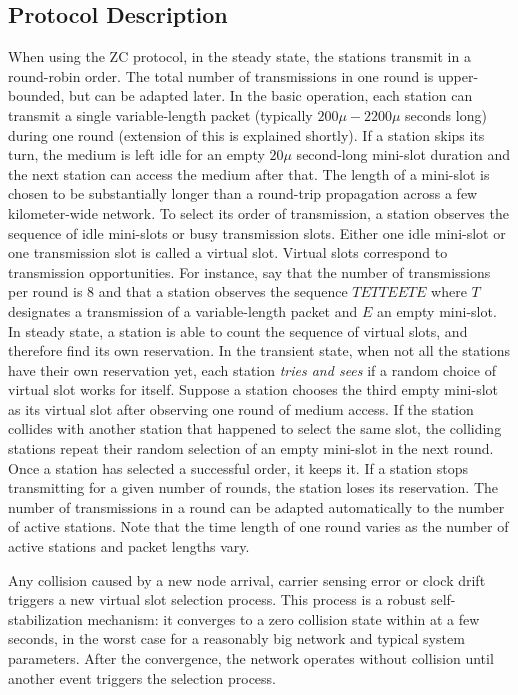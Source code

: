 \documentclass{acm_proc_article-sp}
\begin{document}
\subsection{Protocol Description}
When using the ZC protocol, in the steady state, the stations transmit in a round-robin order.  The total number of transmissions in one round is upper-bounded, but can be adapted later. In the basic operation, each station can transmit a single variable-length packet (typically $200\mu - 2200\mu$ seconds long) during one round (extension of this is explained shortly). If a station skips its turn, the medium is left idle for an empty $20\mu$ second-long mini-slot duration and the next station can access the medium after that. The length of a mini-slot is chosen to be substantially longer than a round-trip propagation across a few kilometer-wide network. To select its order of transmission, a station observes the sequence of idle mini-slots or busy transmission slots. Either one idle mini-slot or one transmission slot is called a virtual slot. Virtual slots correspond to transmission opportunities.  For instance, say that the number of transmissions per round is 8 and that a station observes the sequence $TETTEETE$ where $T$ designates a transmission of a variable-length packet and $E$ an empty mini-slot. In steady state, a station is able to count the sequence of virtual slots, and therefore find its own reservation.
In the transient state, when not all the stations have their own reservation yet, each station \textit{tries and sees} if a random choice of virtual slot works for itself. Suppose a station chooses the third empty mini-slot as its virtual slot after observing one round of medium access. If the station collides with another station that happened to select the same slot, the colliding stations repeat their random selection of an empty mini-slot in the next round.  Once a station has selected a successful order, it keeps it.  If a station stops transmitting for a given number of rounds, the station loses its reservation. The number of transmissions in a round can be adapted automatically to the number of active stations. Note that the time length of one round varies as the number of active stations and packet lengths vary.

Any collision caused by a new node arrival, carrier sensing error or clock drift triggers a new virtual slot selection process. This process is a robust self-stabilization mechanism: it converges to a zero collision state within at a few seconds, in the worst case for a reasonably big network and typical system parameters. After the convergence, the network operates without collision until another event triggers the selection process.
\end{document}
